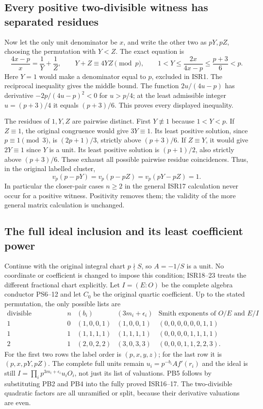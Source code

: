 \documentclass[11pt]{article}
\begin{document}
\subsection{Every positive two-divisible witness has separated residues}
Now let the only unit denominator be $x$, and write the other two as
$pY,pZ$, choosing the permutation with $Y<Z$. The exact equation is
\[
 \frac{4x-p}{x}=\frac1Y+\frac1Z,\qquad
 Y+Z\equiv4YZ\pmod p,\qquad
 1<Y\le\frac{2x}{4x-p}\le\frac{p+3}{6}<p.
 \tag{PB3}
\]
Here $Y=1$ would make a denominator equal to $p$, excluded in ISR1.
The reciprocal inequality gives the middle bound. The function
$2u/(4u-p)$ has derivative $-2p/(4u-p)^2<0$ for $u>p/4$;
at the least admissible integer $u=(p+3)/4$ it equals $(p+3)/6$.
This proves every displayed inequality.

The residues of $1,Y,Z$ are pairwise distinct. First $Y\not\equiv1$
because $1<Y<p$. If $Z\equiv1$, the original congruence would give
$3Y\equiv1$. Its least positive solution, since $p\equiv1\pmod3$,
is $(2p+1)/3$, strictly above $(p+3)/6$. If $Z\equiv Y$, it would
give $2Y\equiv1$ since $Y$ is a unit. Its least positive solution
is $(p+1)/2$, also strictly above $(p+3)/6$. These exhaust all possible
pairwise residue coincidences. Thus, in the original labelled cluster,
\[
 v_p(p-pY)=v_p(p-pZ)=v_p(pY-pZ)=1.
 \tag{PB4}
\]
In particular the closer-pair cases $n\ge2$ in the general ISR17
calculation never occur for a positive witness. Positivity removes them;
the validity of the more general matrix calculation is unchanged.

\subsection{The full ideal inclusion and its least coefficient power}
Continue with the original integral chart $p\nmid S$, so $A=-1/S$
is a unit. No coordinate or coefficient is changed to impose this
condition; ISR18--23 treats the different fractional chart explicitly.
Let $I=(E:O)$ be the complete algebra conductor PS6--12 and let $C_0$
be the original quartic coefficient. Up to the stated permutation,
the only possible lists are
\[
\begin{array}{c|c|c|c|c}
 \text{divisible denominators}&n&(b_i)&(3m_i+\epsilon_i)&
              \text{Smith exponents of }O/E\text{ and }E/I\\\hline
 1&0&(1,0,0,1)&(1,0,0,1)&(0,0,0,0,0,0,1,1)\\
 1&1&(1,1,1,1)&(1,1,1,1)&(0,0,0,0,1,1,1,1)\\
 2&1&(2,0,2,2)&(3,0,3,3)&(0,0,0,1,1,2,2,3).
\end{array}\tag{PB5}
\]
For the first two rows the label order is $(p,x,y,z)$; for the last
row it is $(p,x,pY,pZ)$. The complete full units remain
$u_i=p^{-b_i}Af'(r_i)$ and the ideal is still
$I=\prod_i p^{3m_i+\epsilon_i}u_iO_i$, not just its list of valuations.
PB5 follows by substituting PB2 and PB4 into the fully proved ISR16--17.
The two-divisible quadratic factors are all unramified or split,
because their derivative valuations are even.
\end{document}
